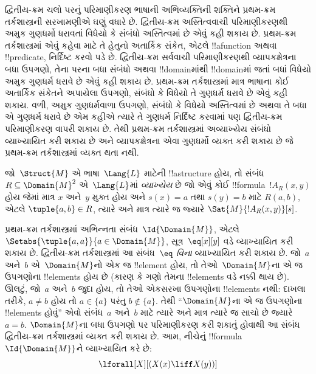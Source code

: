 \documentclass[../../../include/open-logic-section]{subfiles}
\begin{document}

\begin{explain}
દ્વિતીય-ક્રમ ચલો પરનું પરિમાણીકરણ ભાષાની અભિવ્યક્તિની શક્તિને
પ્રથમ-ક્રમ તર્કશાસ્ત્રની સરખામણીએ ઘણું વધારે છે. દ્વિતીય-ક્રમ
અસ્તિત્વવાચી પરિમાણીકરણથી અમુક ગુણધર્મો ધરાવતાં વિધેયો કે સંબંધો
અસ્તિત્વમાં છે એવું કહી શકાય છે. પ્રથમ-ક્રમ તર્કશાસ્ત્રમાં એવું કહેવા
માટે તે હેતુનો અતાર્કિક સંકેત, એટલે !!a{function} અથવા !!{predicate},
નિર્દિષ્ટ કરવો પડે છે. દ્વિતીય-ક્રમ સર્વવાચી પરિમાણીકરણથી વ્યાપકક્ષેત્રના
બધા ઉપગણો, તેના પરના બધા સંબંધો અથવા !!{domain}માંથી !!{domain}માં
જતાં બધાં વિધેયો અમુક ગુણધર્મ ધરાવે છે એવું કહી શકાય છે. પ્રથમ-ક્રમ
તર્કશાસ્ત્રમાં માત્ર ભાષાના કોઈ અતાર્કિક સંકેતને અપાયેલા ઉપગણો,
સંબંધો કે વિધેયો તે ગુણધર્મ ધરાવે છે એવું કહી શકાય. વળી,
અમુક ગુણધર્મવાળા ઉપગણો, સંબંધો કે વિધેયો અસ્તિત્વમાં છે અથવા તે બધા
એ ગુણધર્મ ધરાવે છે એમ કહીએ ત્યારે તે ગુણધર્મ નિર્દિષ્ટ કરવામાં પણ
દ્વિતીય-ક્રમ પરિમાણીકરણ વાપરી શકાય છે. તેથી પ્રથમ-ક્રમ તર્કશાસ્ત્રમાં
અવ્યાખ્યેય સંબંધો વ્યાખ્યાયિત કરી શકાય છે અને વ્યાપકક્ષેત્રના એવા
ગુણધર્મો વ્યક્ત કરી શકાય છે જે પ્રથમ-ક્રમ તર્કશાસ્ત્રમાં વ્યક્ત થતા
નથી.
\end{explain}

\begin{defn}
જો~$\Struct{M}$ એ ભાષા~$\Lang{L}$ માટેની !!a{structure} હોય, તો
સંબંધ~$R \subseteq \Domain{M}^2$ એ~$\Lang{L}$માં \emph{વ્યાખ્યેય}
છે જો એવું કોઈ !!{formula}~$!A_R(x, y)$ હોય જેમાં માત્ર $x$ અને~$y$
મુક્ત હોય અને $s(x) = a$ તથા $s(y) = b$ માટે $R(a, b)$, એટલે
$\tuple{a,b} \in R$, ત્યારે અને માત્ર ત્યારે જ જ્યારે
$\Sat{M}{!A_R(x, y)}[s]$.
\end{defn}

\begin{ex}
પ્રથમ-ક્રમ તર્કશાસ્ત્રમાં અભિન્નતા સંબંધ~$\Id{\Domain{M}}$, એટલે
$\Setabs{\tuple{a,a}}{a \in
  \Domain{M}}$, સૂત્ર~$\eq[x][y]$ વડે વ્યાખ્યાયિત કરી શકાય છે.
દ્વિતીય-ક્રમ તર્કશાસ્ત્રમાં આ સંબંધ~\emph{$\eq$ વિના} વ્યાખ્યાયિત
કરી શકાય છે. જો~$a$ અને~$b$ એ~$\Domain{M}$નો એક જ !!{element}
હોય, તો તેઓ~$\Domain{M}$ના એ જ ઉપગણોના !!{element}s હોય છે (કારણ
કે ગણો તેમના !!{element}s વડે નક્કી થાય છે). ઊલટું, જો~$a$ અને~$b$
જુદા હોય, તો તેઓ એકસરખા ઉપગણોના !!{element}s નથી: દાખલા તરીકે,
$a \neq b$ હોય તો $a \in \{a\}$ પરંતુ $b
\notin \{a\}$. તેથી ``$\Domain{M}$ના એ જ ઉપગણોના !!{element}s
હોવું'' એવો સંબંધ~$a$ અને~$b$ માટે ત્યારે અને માત્ર ત્યારે જ સાચો
છે જ્યારે $a = b$. $\Domain{M}$ના બધા ઉપગણો પર પરિમાણીકરણ કરી
શકાતું હોવાથી આ સંબંધ દ્વિતીય-ક્રમ તર્કશાસ્ત્રમાં વ્યક્ત કરી શકાય છે.
આમ, નીચેનું
!!{formula}~$\Id{\Domain{M}}$ને વ્યાખ્યાયિત કરે છે:
\[
\lforall[X][(X(x) \liff X(y))]
\]
\end{ex}
\end{document}
